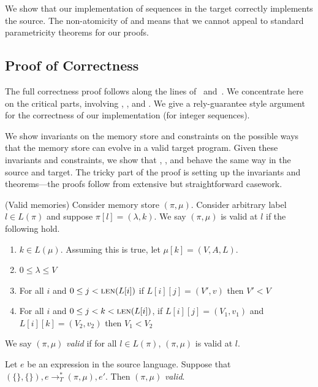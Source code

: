 We show that our implementation of sequences in the target correctly implements the source. The non-atomicity of \set{} and \get{} means that we cannot appeal to standard parametricity theorems for our proofs.

\subsection{Proof of Correctness}

The full correctness proof follows along the lines of~\cite{concurrent-logical} and~\cite{concurrent-logical2}. We concentrate here on the critical parts, involving \new{}, \get{}, and \set{}. We give a rely-guarantee style argument~\cite{rely-guarantee} for the correctness of our implementation (for integer sequences).

We show invariants on the memory store and constraints on the possible ways that the memory store can evolve in a valid target program. Given these invariants and constraints, we show that \new{}, \get{}, and \set{} behave the same way in the source and target. The tricky part of the proof is setting up the invariants and theorems---the proofs follow from extensive but straightforward casework.

\begin{definition}
(Valid memories) Consider memory store $(\pi, \mu)$. Consider arbitrary label $l \in L(\pi)$ and suppose $\pi[l] = (\lambda, k)$. We say $(\pi, \mu)$ is valid at $l$ if the following hold.
\begin{enumerate}
\item $k \in L(\mu)$. Assuming this is true, let $\mu[k] = (V, A, L)$.
\item $0 \leq \lambda \leq V$
\item For all $i$ and $0 \leq j < \text{{\sc len}}(L[i])$ if $L[i][j] = (V', v)$ then $V' < V$
\item For all $i$ and $0 \leq j < k < \text{{\sc len}}(L[i])$, if $L[i][j] = (V_1, v_1)$ and $L[i][k] = (V_2, v_2)$ then $V_1 < V_2$
\end{enumerate}
We say $(\pi, \mu)$ \emph{valid} if for all $l \in L(\pi)$, $(\pi, \mu)$ is valid at $l$. 
\end{definition}

\begin{theorem}
Let $e$ be an expression in the source language. Suppose that $(\{\}, \{\}), e \to^*_T (\pi, \mu), e'$. Then $(\pi, \mu)$ \emph{valid}.
\end{theorem}

